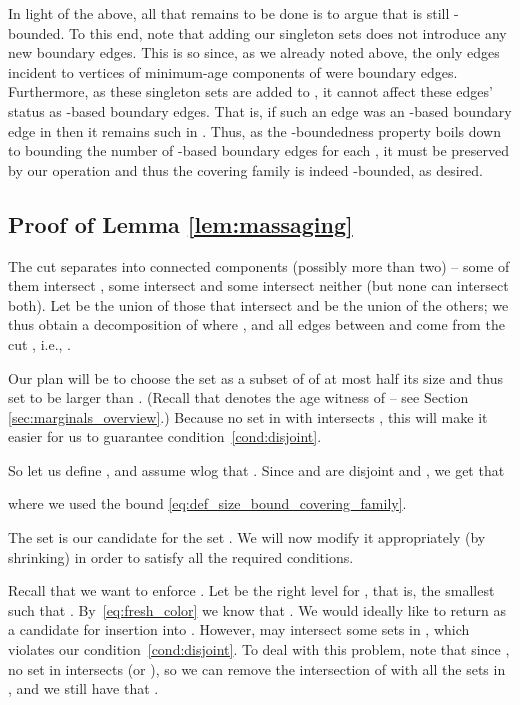 \documentclass[11pt, letterpaper]{article}
\begin{document}
In light of the above, all that remains to be done is to argue that  is still -bounded. To this end, note that adding our singleton sets does not introduce any new boundary edges. This is so since, as we already noted above, the only edges incident to vertices of minimum-age components  of  were boundary edges. Furthermore, as these singleton sets are added to , it cannot affect these edges' status as -based boundary edges. That is, if such an edge was an -based boundary edge in  then it remains such in . Thus, as the -boundedness property boils down to bounding the number of -based boundary edges for each , it must be preserved by our operation and thus the covering family  is indeed -bounded, as desired.

\subsection{Proof of Lemma \ref{lem:massaging}} \label{app:massaging}

The cut  separates  into connected components (possibly more than two) -- some of them intersect , some intersect  and some intersect neither (but none can intersect both). Let  be the union of those that intersect  and  be the union of the others; we thus obtain a decomposition  of  where ,  and all edges between  and  come from the cut , i.e., .

Our plan will be to choose the set  as a subset of  of at most half its size and thus set  to be larger than . (Recall that  denotes the age witness of  -- see Section \ref{sec:marginals_overview}.) Because no set in  with  intersects , this will make it easier for us to guarantee condition~\eqref{cond:disjoint}.

So let us define ,  and assume wlog that . 
Since  and  are disjoint and , we get that

where we used the bound \eqref{eq:def_size_bound_covering_family}.

The set  is our candidate for the set . We will now modify it appropriately (by shrinking) in order to satisfy all the required conditions.

Recall that we want to enforce . Let  be the right level for , that is, the smallest  such that . By~\eqref{eq:fresh_color} we know that . We would ideally like to return  as a candidate for insertion into . However,  may intersect some sets in , which violates our condition~\eqref{cond:disjoint}. To deal with this problem, note that since , no set in  intersects  (or ), so we can remove the intersection of  with all the sets in , and we still have that . 
\end{document}
